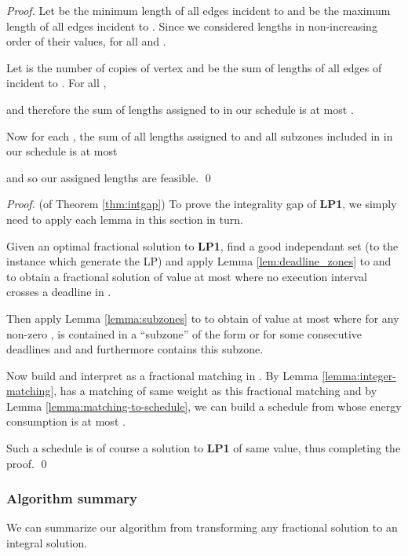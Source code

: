 \begin{proof}
Let  be the minimum length of all edges incident to  and  be the maximum length of all edges incident to . Since we considered lengths in non-increasing order of their  values,  for all  and .


Let  is the number of copies of vertex  and  be the sum of lengths of all edges of  incident to .
For all ,

and therefore the sum of lengths assigned to  in our schedule is at most .


Now for each , the sum of all lengths assigned to  and all subzones included in  in our schedule is at most

and so our assigned lengths are feasible.
\qed\end{proof}

\begin{proof}(of Theorem \ref{thm:intgap})
  To prove the integrality gap of \textbf{LP1}, we simply need to apply each lemma in this section in turn.

  Given an optimal fractional solution  to \textbf{LP1}, find a good independant set  (to the instance which generate the LP) and apply Lemma \ref{lem:deadline_zones} to  and  to obtain a fractional solution  of value at most  where no execution interval crosses a deadline in .

  Then apply Lemma \ref{lemma:subzones} to  to obtain  of value at most  where for any non-zero ,  is contained in a ``subzone'' of the form  or  for some consecutive deadlines  and  and furthermore  contains this subzone.

  Now build  and interpret  as a fractional matching in . By Lemma \ref{lemma:integer-matching},  has a matching  of same weight as this fractional matching and by Lemma \ref{lemma:matching-to-schedule}, we can build a schedule from  whose energy consumption is at most .

  Such a schedule is of course a solution to \textbf{LP1} of same value, thus completing the proof.
\qed\end{proof}









\subsubsection{Algorithm summary}

We can summarize our algorithm from transforming any fractional solution  to an integral solution.

